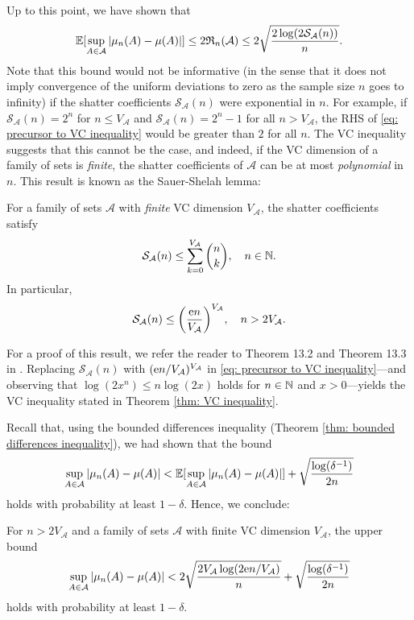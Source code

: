 Up to this point, we have shown that
\begin{equation}
\label{eq: precursor to VC inequality}
    \operatorname{\mathbb{E}}[\sup_{A \in \mathcal{A}} \abs{\mu_n(A) - \mu(A)}] \leq 2 \mathfrak{R}_n(\mathcal{A}) \leq 2 \sqrt{\frac{2 \log(2 \mathcal{S}_{\mathcal{A}}(n))}{n}}.
\end{equation}
Note that this bound would not be informative (in the sense that it does not imply convergence of the uniform deviations to zero as the sample size $n$ goes to infinity) if the shatter coefficients $\mathcal{S}_{\mathcal{A}}(n)$ were exponential in $n$. For example, if $\mathcal{S}_{\mathcal{A}}(n) = 2^n$ for $n \leq V_{\mathcal{A}}$ and $\mathcal{S}_{\mathcal{A}}(n) = 2^n - 1$ for all $n > V_{\mathcal{A}}$, the RHS of \eqref{eq: precursor to VC inequality} would be greater than $2$ for all $n$. The VC inequality suggests that this cannot be the case, and indeed, if the VC dimension of a family of sets is \emph{finite}, the shatter coefficients of $\mathcal{A}$ can be at most \emph{polynomial} in $n$. This result is known as the Sauer-Shelah lemma:

\begin{lemma}
For a family of sets $\mathcal{A}$ with \emph{finite} VC dimension $V_{\mathcal{A}}$, the shatter coefficients satisfy
\[
    \mathcal{S}_{\mathcal{A}}(n) \leq \sum_{k=0}^{V_{\mathcal{A}}} \binom{n}{k}, \quad n \in \mathbb{N}.
\]
In particular,
\[
    \mathcal{S}_{\mathcal{A}}(n) \leq \left(\frac{\e n}{V_{\mathcal{A}}}\right)^{V_{\mathcal{A}}}, \quad n > 2 V_{\mathcal{A}}.
\]
\end{lemma}

For a proof of this result, we refer the reader to Theorem 13.2 and Theorem 13.3 in \cite[pp.~216--218]{devroye1996probabilistic}. Replacing $\mathcal{S}_{\mathcal{A}}(n)$ with $(\mathrm{e} n / V_{\mathcal{A}})^{V_{\mathcal{A}}}$ in \eqref{eq: precursor to VC inequality}---and observing that $\log(2x^n) \leq n \log(2x)$ holds for $n \in \mathbb{N}$ and $x > 0$---yields the VC inequality stated in Theorem \ref{thm: VC inequality}.

Recall that, using the bounded differences inequality (Theorem \ref{thm: bounded differences inequality}), we had shown that the bound
\[
    \sup_{A \in \mathcal{A}} \abs{\mu_n(A) - \mu(A)} < \operatorname{\mathbb{E}}[\sup_{A \in \mathcal{A}} \abs{\mu_n(A) - \mu(A)}] + \sqrt{\frac{\log(\delta^{-1})}{2n}}
\]
holds with probability at least $1 - \delta$. Hence, we conclude:

\begin{corollary}[VC Inequality]
\label{cor: VC inequality}
For $n > 2 V_{\mathcal{A}}$ and a family of sets $\mathcal{A}$ with finite VC dimension $V_{\mathcal{A}}$, the upper bound
\[
    \sup_{A \in \mathcal{A}} \abs{\mu_n(A) - \mu(A)} < 2 \sqrt{\frac{2 V_{\mathcal{A}} \log(2 \mathrm{e} n / V_{\mathcal{A}})}{n}} + \sqrt{\frac{\log(\delta^{-1})}{2n}}
\]
holds with probability at least $1 - \delta$.
\end{corollary}


